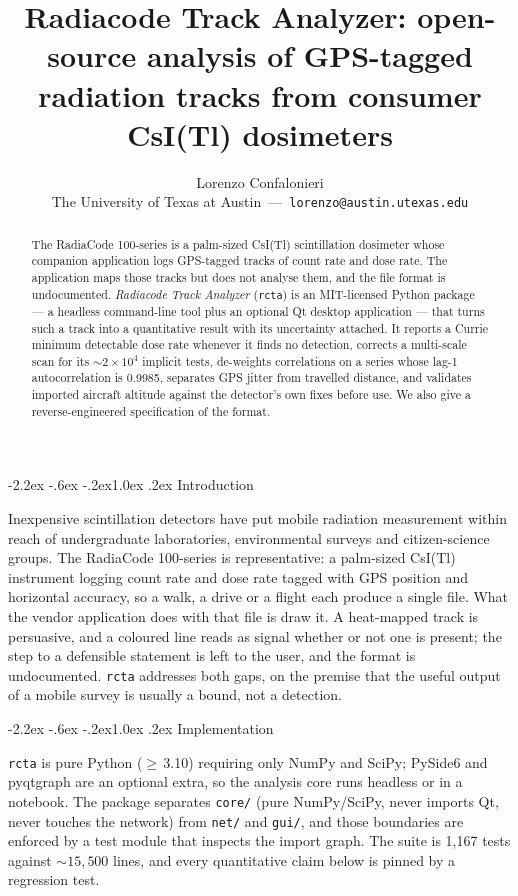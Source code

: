 \documentclass[10pt,twocolumn]{article}
\title{\vspace{-1.4em}\large\bf Radiacode Track Analyzer: open-source analysis
of GPS-tagged radiation tracks from consumer CsI(Tl) dosimeters}
\author{\normalsize Lorenzo Confalonieri\\[1pt]
\small The University of Texas at Austin\, ---\,
\texttt{lorenzo@austin.utexas.edu}}
\date{}
\makeatletter
\renewcommand\section{\@startsection{section}{1}{\z@}%
  {-2.2ex \@plus -.6ex \@minus -.2ex}{1.0ex \@plus .2ex}%
  {\normalfont\large\bfseries}}
\makeatother
\begin{document}
\maketitle

\begin{abstract}
\noindent
\small
The RadiaCode 100-series is a palm-sized CsI(Tl) scintillation dosimeter whose
companion application logs GPS-tagged tracks of count rate and dose rate. The
application maps those tracks but does not analyse them, and the file format is
undocumented. \emph{Radiacode Track Analyzer} (\texttt{rcta}) is an
MIT-licensed Python package --- a headless command-line tool plus an optional
Qt desktop application --- that turns such a track into a quantitative result
with its uncertainty attached. It reports a Currie minimum detectable dose rate
whenever it finds no detection, corrects a multi-scale scan for its
${\sim}2\times10^{4}$ implicit tests, de-weights correlations on a series whose
lag-1 autocorrelation is 0.9985, separates GPS jitter from travelled distance,
and validates imported aircraft altitude against the detector's own fixes
before use. We also give a reverse-engineered specification of the format.
\end{abstract}

\section{Introduction}

Inexpensive scintillation detectors have put mobile radiation measurement
within reach of undergraduate laboratories, environmental surveys and
citizen-science groups. The RadiaCode 100-series is representative: a
palm-sized CsI(Tl) instrument logging count rate and dose rate tagged with GPS
position and horizontal accuracy, so a walk, a drive or a flight each produce
a single file. What the vendor application does with that file is draw it. A
heat-mapped track is persuasive, and a coloured line reads as signal whether or
not one is present; the step to a defensible statement is left to the user, and
the format is undocumented. \texttt{rcta} addresses both gaps, on the premise
that the useful output of a mobile survey is usually a bound, not a
detection.

\section{Implementation}

\texttt{rcta} is pure Python ($\geq$\,3.10) requiring only NumPy and SciPy;
PySide6 and pyqtgraph are an optional extra, so the analysis core runs headless
or in a notebook. The package separates \texttt{core/} (pure NumPy/SciPy, never
imports Qt, never touches the network) from \texttt{net/} and \texttt{gui/},
and those boundaries are enforced by a test module that inspects the import
graph. The suite is 1{,}167 tests against ${\sim}15{,}500$ lines, and every
quantitative claim below is pinned by a regression test.
\end{document}
